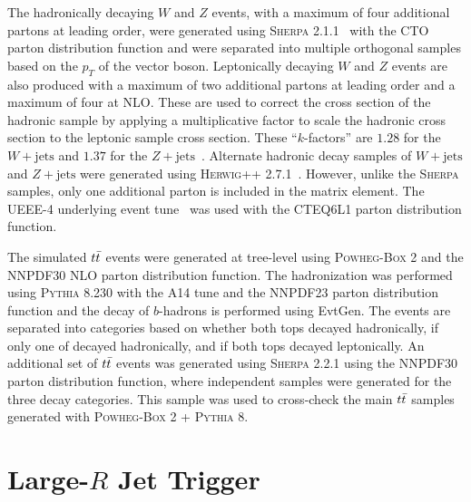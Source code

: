The hadronically decaying $W$ and $Z$ events, with a maximum of four additional partons at leading order, were generated using \textsc{Sherpa} 2.1.1~\cite{Gleisberg:2008ta} with the CTO parton distribution function and were separated into multiple orthogonal samples based on the $p_{T}$ of the vector boson.
Leptonically decaying $W$ and $Z$ events are also produced with a maximum of two additional partons at leading order and a maximum of four at NLO.
These are used to correct the cross section of the hadronic sample by applying a multiplicative factor to scale the hadronic cross section to the leptonic sample cross section.
These ``$k$-factors'' are $1.28$ for the $W+\mathrm{jets}$ and $1.37$ for the $Z+\mathrm{jets}$~\cite{EXOT-2017-01}.
Alternate hadronic decay samples of $W+\mathrm{jets}$ and $Z+\mathrm{jets}$ were generated using \textsc{Herwig++} 2.7.1~\cite{Bahr:2008pv}.
However, unlike the \textsc{Sherpa} samples, only one additional parton is included in the matrix element.
The UEEE-4 underlying event tune~\cite{Buckley:2018wdv} was used with the CTEQ6L1 parton distribution function.

The simulated $t\bar{t}$ events were generated at tree-level using \textsc{Powheg-Box} 2 and the NNPDF30 NLO parton distribution function.
The hadronization was performed using \textsc{Pythia} 8.230 with the A14 tune and the NNPDF23 parton distribution function and the decay of $b$-hadrons is performed using EvtGen.
The events are separated into categories based on whether both tops decayed hadronically, if only one of decayed hadronically, and if both tops decayed leptonically.
An additional set of $t\bar{t}$ events was generated using \textsc{Sherpa} 2.2.1 using the NNPDF30 parton distribution function, where independent samples were generated for the three decay categories.
This sample was used to cross-check the main $t\bar{t}$ samples generated with \textsc{Powheg-Box} 2 + \textsc{Pythia} 8.

\section{Large-$R$ Jet Trigger}\label{sec:analysis_trigger}

